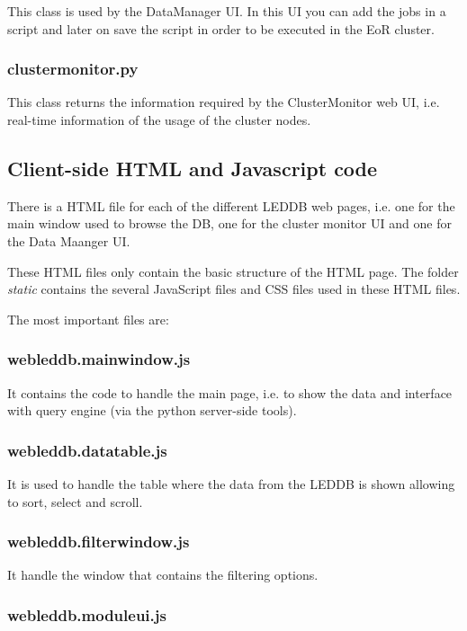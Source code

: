 \documentclass[a4paper,11pt]{article}
\begin{document}
This class is used by the DataManager UI. In this UI you can add the jobs in a script and later on save the script in order to be executed in the EoR cluster.

\subsubsection*{clustermonitor.py}

This class returns the information required by the ClusterMonitor web UI, i.e. real-time information of the usage of the cluster nodes.

\subsection{Client-side HTML and Javascript code}

There is a HTML file for each of the different LEDDB web pages, i.e. one for the main window used to browse the DB, one for the cluster monitor UI and one for the Data Maanger UI.

These HTML files only contain the basic structure of the HTML page. The folder \textit{static} contains the several JavaScript files and CSS files used in these HTML files.

The most important files are:

\subsubsection*{webleddb.mainwindow.js}

It contains the code to handle the main page, i.e. to show the data and interface with query engine (via the python server-side tools).

\subsubsection*{webleddb.datatable.js}

It is used to handle the table where the data from the LEDDB is shown allowing to sort, select and scroll.

\subsubsection*{webleddb.filterwindow.js}
 
It handle the window that contains the filtering options.

\subsubsection*{webleddb.moduleui.js}
\end{document}
